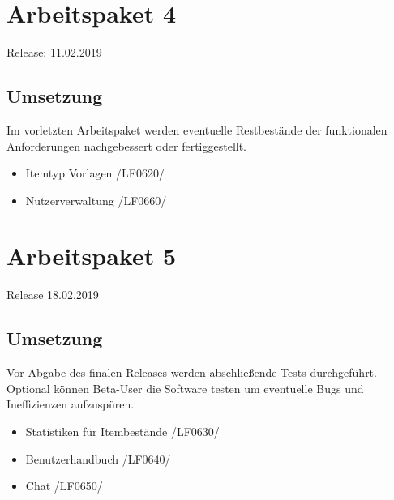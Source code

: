 \documentclass[11pt,a4paper]{report}
\begin{document}
\section{Arbeitspaket 4}
Release: 11.02.2019
\subsection{Umsetzung}
Im vorletzten Arbeitspaket werden eventuelle Restbestände der funktionalen Anforderungen nachgebessert oder fertiggestellt.
\begin{itemize}
\item Itemtyp Vorlagen /LF0620/
\item Nutzerverwaltung /LF0660/
\end{itemize}

\section{Arbeitspaket 5}
Release 18.02.2019
\subsection{Umsetzung}
Vor Abgabe des finalen Releases werden abschließende Tests durchgeführt. Optional können Beta-User die Software testen um eventuelle Bugs und Ineffizienzen aufzuspüren.
\begin{itemize}
\item Statistiken für Itembestände /LF0630/
\item Benutzerhandbuch /LF0640/
\item Chat /LF0650/
\end{itemize}
\end{document}
